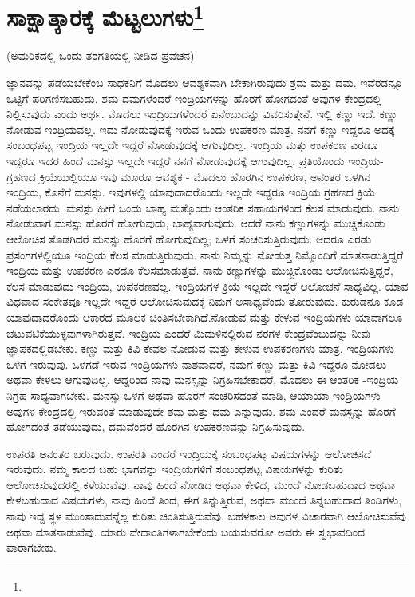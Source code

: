 
\chapter[ಸಾಕ್ಷಾತ್ಕಾರಕ್ಕೆ ಮೆಟ್ಟಲುಗಳು]{ಸಾಕ್ಷಾತ್ಕಾರಕ್ಕೆ ಮೆಟ್ಟಲುಗಳು\protect\footnote{}}

\begin{center}
(ಅಮರಿಕದಲ್ಲಿ ಒಂದು ತರಗತಿಯಲ್ಲಿ ನೀಡಿದ ಪ್ರವಚನ)
\end{center}

ಜ್ಞಾನವನ್ನು ಪಡೆಯಬೇಕೆಂಬ ಸಾಧಕನಿಗೆ ಮೊದಲು ಆವಶ್ಯಕವಾಗಿ ಬೇಕಾಗಿರುವುದು ಶ್ರಮ ಮತ್ತು ದಮ. ಇವೆರಡನ್ನೂ ಒಟ್ಟಿಗೆ ಪರಿಗಣಿಸಬಹುದು. ಶಮ ದಮಗಳೆಂದರೆ ಇಂದ್ರಿಯಗಳನ್ನು ಹೊರಗೆ ಹೋಗದಂತೆ ಅವುಗಳ ಕೇಂದ್ರದಲ್ಲಿ ನಿಲ್ಲಿಸುವುದು ಎಂದು ಅರ್ಥ. ಮೊದಲು ಇಂದ್ರಿಯಗಳೆಂದರೆ ಏನೆಂಬುದನ್ನು ವಿವರಿಸುತ್ತೇನೆ. ಇಲ್ಲಿ ಕಣ್ಣು ಇದೆ. ಕಣ್ಣು ನೋಡುವ ಇಂದ್ರಿಯವಲ್ಲ. ಇದು ನೋಡುವುದಕ್ಕೆ ಇರುವ ಒಂದು ಉಪಕರಣ ಮಾತ್ರ. ನನಗೆ ಕಣ್ಣು ಇದ್ದರೂ ಅದಕ್ಕೆ ಸಂಬಂಧಪಟ್ಟ ಇಂದ್ರಿಯ ಇಲ್ಲದೇ ಇದ್ದರೆ ನೋಡುವುದಕ್ಕೆ ಆಗುವುದಿಲ್ಲ. ಇಂದ್ರಿಯ ಮತ್ತು ಉಪಕರಣ ಎರಡೂ ಇದ್ದರೂ ಇದರ ಹಿಂದೆ ಮನಸ್ಸು ಇಲ್ಲದೇ ಇದ್ದರೆ ನನಗೆ ನೋಡುವುದಕ್ಕೆ ಆಗುವುದಿಲ್ಲ. ಪ್ರತಿಯೊಂದು ಇಂದ್ರಿಯ-ಗ್ರಹಣದ ಕ್ರಿಯೆಯಲ್ಲಿಯೂ ಇವು ಮೂರೂ ಆವಶ್ಯಕ - ಮೊದಲು ಹೊರಗಿನ ಉಪಕರಣ, ಅನಂತರ ಒಳಗಿನ ಇಂದ್ರಿಯ, ಕೊನೆಗೆ ಮನಸ್ಸು. ಇವುಗಳಲ್ಲಿ ಯಾವುದಾದರೊಂದು ಇಲ್ಲದೇ ಇದ್ದರೂ ಇಂದ್ರಿಯ ಗ್ರಹಣದ ಕ್ರಿಯೆ ನಡೆಯಲಾರದು. ಮನಸ್ಸು ಹೀಗೆ ಒಂದು ಬಾಹ್ಯ ಮತ್ತೊಂದು ಆಂತರಿಕ ಸಹಾಯಗಳಿಂದ ಕೆಲಸ ಮಾಡುವುದು. ನಾನು ನೋಡುವಾಗ ಮನಸ್ಸು ಹೊರಗೆ ಹೋಗುವುದು, ಬಾಹ್ಯವಾಗುವುದು. ಆದರೆ ನಾನು ಕಣ್ಣುಗಳನ್ನು ಮುಚ್ಚಿಕೊಂಡು ಆಲೋಚಿಸ ತೊಡಗಿದರೆ ಮನಸ್ಸು ಹೊರಗೆ ಹೋಗುವುದಿಲ್ಲ; ಒಳಗೆ ಸಂಚರಿಸುತ್ತಿರುವುದು. ಆದರೂ ಎರಡು ಪ್ರಸಂಗಗಳಲ್ಲಿಯೂ ಇಂದ್ರಿಯ ಕೆಲಸ ಮಾಡುತ್ತಿರುವುದು. ನಾನು ನಿಮ್ಮನ್ನು ನೋಡುತ್ತ ನಿಮ್ಮೊಂದಿಗೆ ಮಾತನಾಡುತ್ತಿದ್ದರೆ ಇಂದ್ರಿಯ ಮತ್ತು ಉಪಕರಣ ಎರಡೂ ಕೆಲಸಮಾಡುತ್ತವೆ. ನಾನು ಕಣ್ಣುಗಳನ್ನು ಮುಚ್ಚಿಕೊಂಡು ಆಲೋಚಿಸುತ್ತಿದ್ದರೆ, ಕೆಲಸ ಮಾಡುವುದು ಇಂದ್ರಿಯ, ಉಪಕರಣವಲ್ಲ. ಇಂದ್ರಿಯಗಳ ಕ್ರಿಯೆ ಇಲ್ಲದೇ ಇದ್ದರೆ ಆಲೋಚನೆ ಸಾಧ್ಯವಿಲ್ಲ. ಯಾವ ವಿಧವಾದ ಸಂಕೇತವೂ ಇಲ್ಲದೇ ಇದ್ದರೆ ಆಲೋಚಿಸುವುದಕ್ಕೆ ನಿಮಗೆ ಅಸಾಧ್ಯವೆಂದು ತೋರುವುದು. ಕುರುಡನೂ ಕೂಡ ಯಾವುದಾದರೊಂದು ಆಕಾರದ ಮೂಲಕ ಚಿಂತಿಸಬೇಕಾಗಿದೆ.ನೋಡುವ ಮತ್ತು ಕೇಳುವ ಇಂದ್ರಿಯಗಳು ಯಾವಾಗಲೂ ಚಟುವಟಿಕೆಯುಳ್ಳವುಗಳಾಗಿರುತ್ತವೆ. ಇಂದ್ರಿಯ ಎಂದರೆ ಮಿದುಳಿನಲ್ಲಿರುವ ನರಗಳ ಕೇಂದ್ರವೆಂಬುದನ್ನು ನೀವು ಜ್ಞಾಪಕದಲ್ಲಿಡಬೇಕು. ಕಣ್ಣು ಮತ್ತು ಕಿವಿ ಕೇವಲ ನೋಡುವ ಮತ್ತು ಕೇಳುವ ಉಪಕರಣಗಳು ಮಾತ್ರ. ಇಂದ್ರಿಯಗಳು ಒಳಗೆ ಇರುವುವು. ಒಳಗಡೆ ಇರುವ ಇಂದ್ರಿಯಗಳು ನಾಶವಾದರೆ, ನಮಗೆ ಕಣ್ಣು ಮತ್ತು ಕಿವಿ ಇದ್ದರೂ ನೋಡಲು ಅಥವಾ ಕೇಳಲು ಆಗುವುದಿಲ್ಲ. ಆದ್ದರಿಂದ ನಾವು ಮನಸ್ಸನ್ನು ನಿಗ್ರಹಿಸಬೇಕಾದರೆ, ಮೊದಲು ಈ ಆಂತರಿಕ -ಇಂದ್ರಿಯ ನಿಗ್ರಹ ಸಾಧ್ಯವಾಗಬೇಕು. ಮನಸ್ಸು ಒಳಗೆ ಅಥವಾ ಹೊರಗೆ ಸಂಚರಿಸದಂತೆ ಮಾಡಿ, ಆಯಾಯಾ ಇಂದ್ರಿಯಗಳು ಅವುಗಳ ಕೇಂದ್ರದಲ್ಲಿ ಇರುವಂತೆ ಮಾಡುವುದೇ ಶಮ ಮತ್ತು ದಮ ಎನ್ನುವುದು. ಶಮ ಎಂದರೆ ಮನಸ್ಸನ್ನು ಹೊರಗೆ ಹೋಗದಂತೆ ತಡೆಯುವುದು, ದಮವೆಂದರೆ ಹೊರಗಿನ ಉಪಕರಣವನ್ನು ನಿಗ್ರಹಿಸುವುದು.

ಉಪರತಿ ಅನಂತರ ಬರುವುದು. ಉಪರತಿ ಎಂದರೆ ಇಂದ್ರಿಯಕ್ಕೆ ಸಂಬಂಧಪಟ್ಟ ವಿಷಯಗಳನ್ನು ಆಲೋಚಿಸದೆ ಇರುವುದು. ನಮ್ಮ ಕಾಲದ ಬಹು ಭಾಗವನ್ನು ಇಂದ್ರಿಯಗಳಿಗೆ ಸಂಬಂಧಪಟ್ಟ ವಿಷಯಗಳನ್ನು ಕುರಿತು ಆಲೋಚಿಸುವುದರಲ್ಲಿ ಕಳೆಯುವೆವು. ನಾವು ಹಿಂದೆ ನೋಡಿದ ಅಥವಾ ಕೇಳಿದ, ಮುಂದೆ ನೋಡಬಹುದಾದ ಅಥವಾ ಕೇಳಬಹುದಾದ ವಿಷಯಗಳು, ನಾವು ಹಿಂದೆ ತಿಂದ, ಈಗ ತಿನ್ನುತ್ತಿರುವ, ಅಥವಾ ಮುಂದೆ ತಿನ್ನಬಹುದಾದ ತಿಂಡಿಗಳು, ನಾವು ಇದ್ದ ಸ್ಥಳ ಮುಂತಾದುವನ್ನೆಲ್ಲ ಕುರಿತು ಚಿಂತಿಸುತ್ತಿರುವೆವು. ಬಹಳಕಾಲ ಅವುಗಳ ವಿಚಾರವಾಗಿ ಆಲೋಚಿಸುವೆವು ಅಥವಾ ಮಾತನಾಡುವೆವು. ಯಾರು ವೇದಾಂತಿಗಳಾಗಬೇಕೆಂದು ಬಯಸುವರೋ ಅವರು ಈ ಸ್ವಭಾವದಿಂದ ಪಾರಾಗಬೇಕು.

